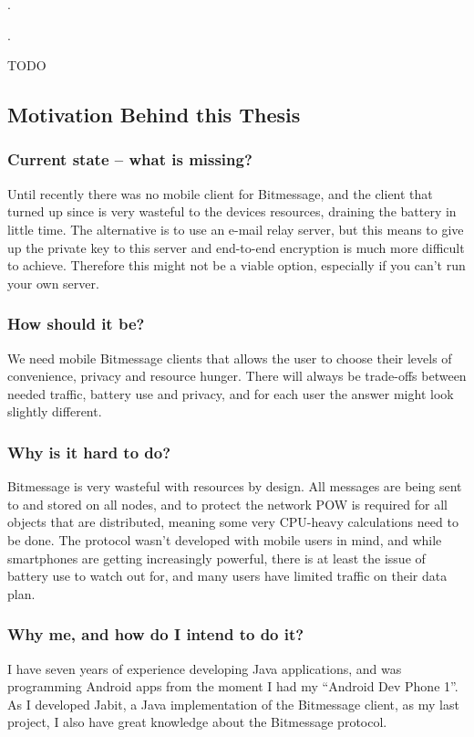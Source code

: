 \documentclass{bfh}
\begin{document}
  .

  .

  TODO


  \subsection{Motivation Behind this Thesis}
  \subsubsection{Current state -- what is missing?}
  Until recently there was no mobile client for Bitmessage, and the client that turned up since is very wasteful to the devices resources, draining the battery in little time. The alternative is to use an e-mail relay server, but this means to give up the private key to this server and end-to-end encryption is much more difficult to achieve. Therefore this might not be a viable option, especially if you can't run your own server.

  \subsubsection{How should it be?}
  We need mobile Bitmessage clients that allows the user to choose their levels of convenience, privacy and resource hunger. There will always be trade-offs between needed traffic, battery use and privacy, and for each user the answer might look slightly different.

  \subsubsection{Why is it hard to do?}
  Bitmessage is very wasteful with resources by design. All messages are being sent to and stored on all nodes, and to protect the network \ac{POW} is required for all objects that are distributed, meaning some very \acs{CPU}-heavy calculations need to be done. The protocol wasn't developed with mobile users in mind, and while smartphones are getting increasingly powerful, there is at least the issue of battery use to watch out for, and many users have limited traffic on their data plan.

  \subsubsection{Why me, and how do I intend to do it?}
  I have seven years of experience developing Java applications, and was programming Android apps from the moment I had my ``Android Dev Phone 1''. As I developed Jabit, a Java implementation of the Bitmessage client, as my last project, I also have great knowledge about the Bitmessage protocol.
\end{document}
